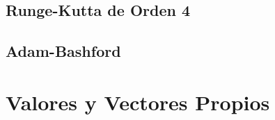 \documentclass[10pt,a4paper]{article}
\begin{document}
	\subsection{Runge-Kutta de Orden 4}
	
	\subsection{Adam-Bashford}
	
	
	
	\section{Valores y Vectores Propios}
	
\end{document}
